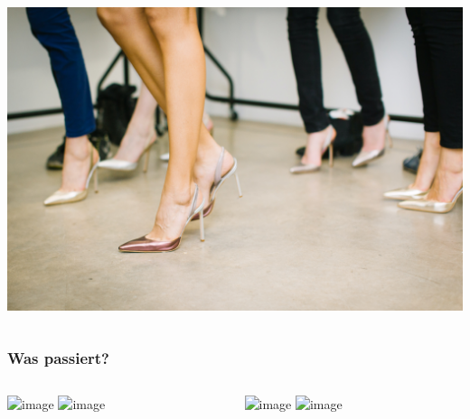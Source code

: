 \documentclass{beamer}
\begin{document}
\begin{frame}
\begin{columns}[c]
\begin{column}{5cm}
\begin{center}
\includegraphics[width=\textwidth]{stiletto.jpg}
\end{center}

\end{column}

\end{columns}
\end{frame}


\begin{frame}
\frametitle{Was passiert?}

\begin{columns}[c]

\begin{column}{5cm}
\begin{center}
\includegraphics<1>[width=0.8\textwidth]{stempeldruck_fluessigkeit.png}
\includegraphics<2>[width=0.8\textwidth]{stempeldruck_fluessigkeit_2.png}
\end{center}
\end{column}

\begin{column}{5cm}
\begin{center}
\includegraphics<1>[width=0.8\textwidth]{stempeldruck_gas.png}
\includegraphics<2>[width=0.8\textwidth]{stempeldruck_gas_2.png}
\end{center}
\end{column}



\end{columns}

\end{frame}
\end{document}
